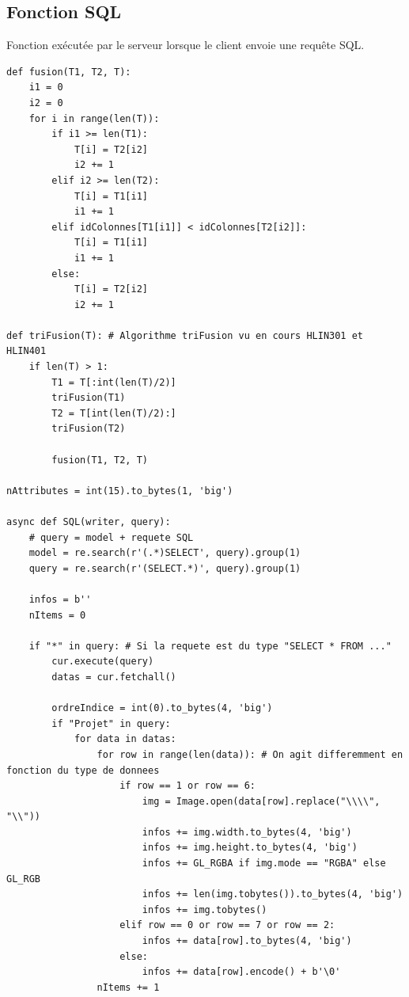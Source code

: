 \documentclass[twoside]{report}
\begin{document}
\begin{appendix}
\section{Fonction SQL}
Fonction exécutée par le serveur lorsque le client envoie une requête SQL.

\begin{lstlisting}[style=py, caption=serveur.py : SQL, label=sql]
def fusion(T1, T2, T):
    i1 = 0
    i2 = 0
    for i in range(len(T)):
        if i1 >= len(T1):
            T[i] = T2[i2]
            i2 += 1
        elif i2 >= len(T2):
            T[i] = T1[i1]
            i1 += 1
        elif idColonnes[T1[i1]] < idColonnes[T2[i2]]:
            T[i] = T1[i1]
            i1 += 1
        else:
            T[i] = T2[i2]
            i2 += 1

def triFusion(T): # Algorithme triFusion vu en cours HLIN301 et HLIN401
    if len(T) > 1:
        T1 = T[:int(len(T)/2)]
        triFusion(T1)
        T2 = T[int(len(T)/2):]
        triFusion(T2)
        
        fusion(T1, T2, T)

nAttributes = int(15).to_bytes(1, 'big')

async def SQL(writer, query):
    # query = model + requete SQL
    model = re.search(r'(.*)SELECT', query).group(1)
    query = re.search(r'(SELECT.*)', query).group(1)

    infos = b''
    nItems = 0

    if "*" in query: # Si la requete est du type "SELECT * FROM ..."
        cur.execute(query)
        datas = cur.fetchall()

        ordreIndice = int(0).to_bytes(4, 'big')
        if "Projet" in query:
            for data in datas:
                for row in range(len(data)): # On agit differemment en fonction du type de donnees
                    if row == 1 or row == 6:
                        img = Image.open(data[row].replace("\\\\", "\\"))
                        infos += img.width.to_bytes(4, 'big')
                        infos += img.height.to_bytes(4, 'big')
                        infos += GL_RGBA if img.mode == "RGBA" else GL_RGB
                        infos += len(img.tobytes()).to_bytes(4, 'big')
                        infos += img.tobytes()
                    elif row == 0 or row == 7 or row == 2:
                        infos += data[row].to_bytes(4, 'big')
                    else:
                        infos += data[row].encode() + b'\0'
                nItems += 1


\end{lstlisting}
\end{appendix}
\end{document}
